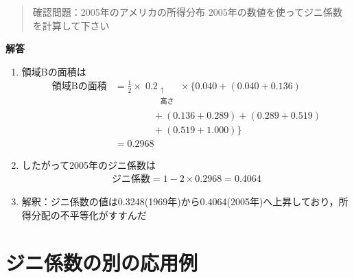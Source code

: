 \documentclass[
]{book}
\theoremstyle{definition}
\theoremstyle{definition}
\theoremstyle{definition}
\theoremstyle{definition}
\theoremstyle{remark}
\begin{document}
\begin{quote}
確認問題：2005年のアメリカの所得分布
2005年の数値を使ってジニ係数を計算して下さい
\end{quote}

\textbf{解答}

\begin{enumerate}
\def\labelenumi{\arabic{enumi}.}
\item
  領域Bの面積は
  \begin{align*}
  \text{領域Bの面積}
  &=\tfrac{1}{2} \times \mathop{0.2}_{\substack{\uparrow \\ \text{高さ}}} \times 
  \{ 0.040+ (0.040+0.136) \\
  &\qquad\qquad+(0.136+0.289)+(0.289+0.519) \\
  &\qquad\qquad+(0.519+1.000) \} \\
  &=0.2968
  \end{align*}
\item
  したがって2005年のジニ係数は
  \begin{align*}
  \text{ジニ係数}
  =1-2 \times 0.2968
  =0.4064
  \end{align*}
\item
  解釈：ジニ係数の値は0.3248(1969年)から0.4064(2005年)へ上昇しており，所得分配の不平等化がすすんだ
\end{enumerate}

\hypertarget{ux30b8ux30cbux4fc2ux6570ux306eux5225ux306eux5fdcux7528ux4f8b}{%
\chapter{ジニ係数の別の応用例}\label{ux30b8ux30cbux4fc2ux6570ux306eux5225ux306eux5fdcux7528ux4f8b}}
\end{document}
